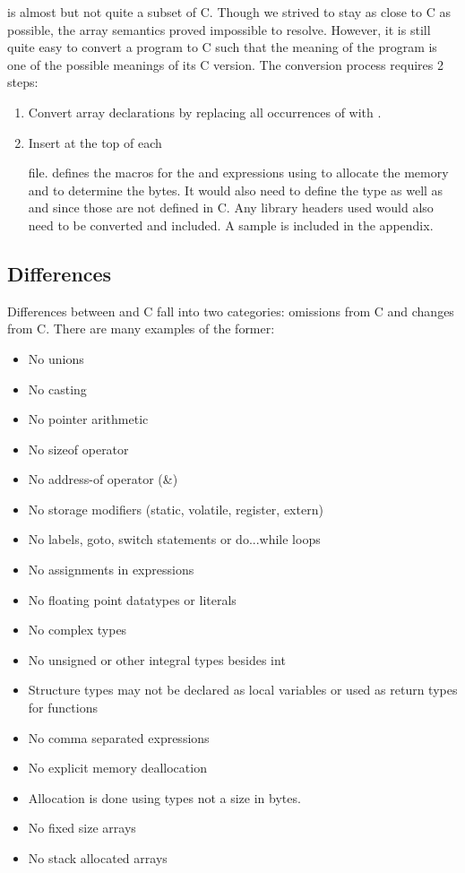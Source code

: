 \langname{} is almost but not quite a subset of C. Though we strived to stay as
close to C as possible, the array semantics proved impossible to resolve.
However, it is still quite easy to convert a \langname{} program to C such that
the meaning of the \langname{} program is one of the possible meanings of its C
version. The conversion process requires 2 steps:

\begin{enumerate}

\item Convert array declarations by replacing all occurrences of \langtext{[]}
with \langtext{*}.

\item Insert  at the top of each

\langname{} file.   defines the macros for the
 and  expressions using
 to allocate the memory and  to determine the
bytes. It would also need to define the  type as well as
 and  since those are not defined in C. Any
library headers used would also need to be converted and included. A sample
 is included in the appendix.

\end{enumerate}

\subsection{Differences}

Differences between \langname{} and C fall into two categories: omissions from
C and changes from C. There are many examples of the former:

\begin{itemize}
\item No unions
\item No casting
\item No pointer arithmetic
\item No sizeof operator
\item No address-of operator (\&)
\item No storage modifiers (static, volatile, register, extern)
\item No labels, goto, switch statements or do...while loops
\item No assignments in expressions
\item No floating point datatypes or literals
\item No complex types
\item No unsigned or other integral types besides int
\item Structure types may not be declared as local variables or used as return types for functions
\item No comma separated expressions
\item No explicit memory deallocation
\item Allocation is done using types not a size in bytes.
\item No fixed size arrays
\item No stack allocated arrays
\end{itemize}


